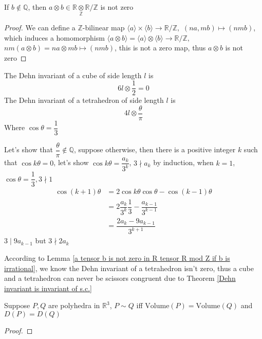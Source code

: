 \documentclass[../main.tex]{subfiles}
\begin{document}
\begin{lemma}\label{a tensor b is not zero in R tensor R mod Z if b is irrational}
If $b\notin\mathbb Q$, then $a\otimes b\in\mathbb R\underset{\mathbb Z}{\otimes}\mathbb R/\mathbb Z$ is not zero
\end{lemma}

\begin{proof}
We can define a $\mathbb Z$-bilinear map $\langle a\rangle\times\langle b\rangle\to\mathbb R/\mathbb Z,$ $(na,mb)\mapsto(nmb)$, which induces a homomorphism $\langle a\otimes b\rangle=\langle a\rangle\otimes\langle b\rangle\to\mathbb R/\mathbb Z,$ $nm(a\otimes b)=na\otimes mb\mapsto(nmb)$, this is not a zero map, thus $a\otimes b$ is not zero
\end{proof}

\begin{example}
The Dehn invariant of a cube of side length $l$ is
\[6l\otimes\dfrac{1}{2}=0\]
The Dehn invariant of a tetrahedron of side length $l$ is
\[4l\otimes\dfrac{\theta}{\pi}\]
Where $\cos\theta=\dfrac{1}{3}$ \par
Let's show that $\dfrac{\theta}{\pi}\notin\mathbb Q$, suppose otherwise, then there is a positive integer $k$ such that $\cos k\theta=0$, let's show $\cos k\theta=\dfrac{a_k}{3^k}$, $3\nmid a_k$ by induction, when $k=1$, $\cos\theta=\dfrac{1}{3},3\nmid1$
\begin{align*}
\cos(k+1)\theta&=2\cos k\theta\cos\theta-\cos(k-1)\theta \\
&=2\dfrac{a_k}{3^k}\dfrac{1}{3}-\dfrac{a_{k-1}}{3^{k-1}} \\
&=\dfrac{2a_k-9a_{k-1}}{3^{k+1}}
\end{align*}
$3\mid9a_{k-1}$ but $3\nmid2a_k$ \par
According to Lemma \ref{a tensor b is not zero in R tensor R mod Z if b is irrational}, we know the Dehn invariant of a tetrahedron isn't zero, thus a cube and a tetrahedron can never be scissors congruent due to Theorem \ref{Dehn invariant is invariant of s.c.}
\end{example}

\begin{theorem}[Sydler]
Suppose $P,Q$ are polyhedra in $\mathbb R^3$, $P\sim Q$ iff $\mathrm{Volume}(P)=\mathrm{Volume}(Q)$ and $D(P)=D(Q)$
\end{theorem}

\begin{proof}

\end{proof}
\end{document}
